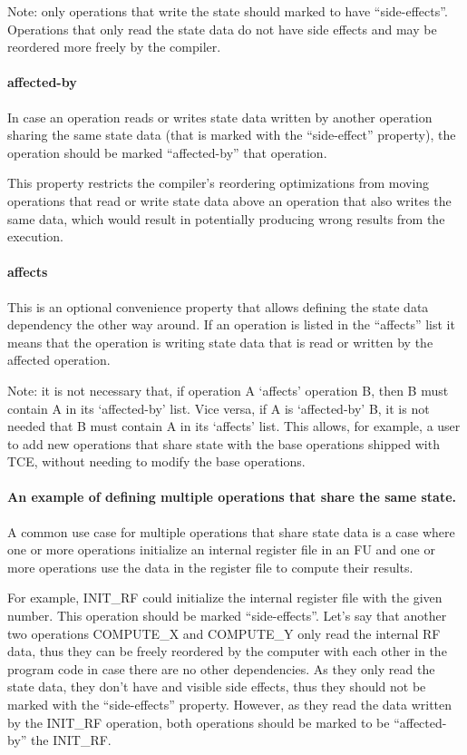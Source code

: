 \documentclass[twoside]{tceusermanual}
\begin{document}
Note: only operations that write the state should marked to
have ``side-effects''. Operations that only read the state data do not
have side effects and may be reordered more freely by the compiler.

\paragraph{affected-by}

In case an operation reads or writes state data written by another 
operation sharing the same state data (that is marked with the
``side-effect'' property), the operation should be marked ``affected-by''
that operation. 

This property restricts the compiler's reordering optimizations 
from moving operations that read or write state data above an operation
that also writes the same data, which would result in potentially
producing wrong results from the execution.

\paragraph{affects}

This is an optional convenience property that allows defining
the state data dependency the other way around. If an operation
is listed in the ``affects'' list it means that the operation
is writing state data that is read or written by the affected operation.

Note: it is not necessary that, if operation A `affects' operation B, then B
must contain A in its `affected-by' list.  Vice versa, if A is `affected-by'
B, it is not needed that B must contain A in its `affects' list. This
allows, for example, a user to add new operations that share state with 
the base operations shipped with TCE, without needing to modify the base
operations.

\paragraph{An example of defining multiple operations that share the
same state.} A common use case for multiple operations that share
state data is a case where one or more operations initialize an
internal register file in an FU and one or more operations use the
data in the register file to compute their results.

For example, INIT\_RF could initialize the internal register
file with the given number. This operation should be marked
``side-effects''. Let's say that another two operations COMPUTE\_X and
COMPUTE\_Y only read the internal RF data, thus they can be freely
reordered by the computer with each other in the program code in case
there are no other dependencies. As they only read the state data,
they don't have and visible side effects, thus they should not
be marked with the ``side-effects'' property. However, as they read
the data written by the INIT\_RF operation, both operations should
be marked to be ``affected-by'' the INIT\_RF.
\end{document}
